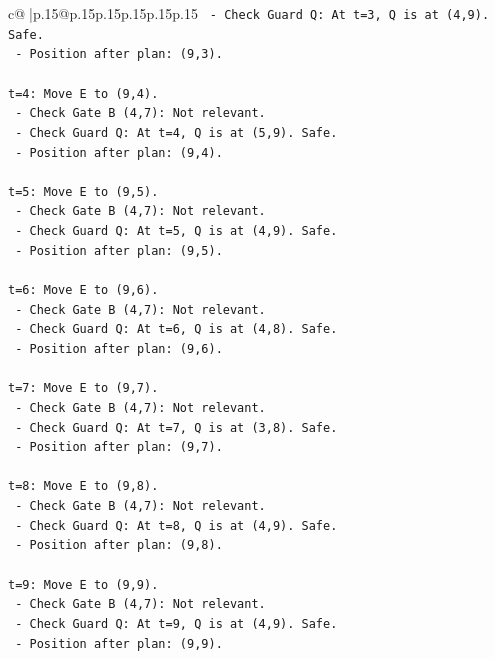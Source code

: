 \documentclass{article}
\begin{document}
{\begin{supertabular}{c@{$\;$}|p{.15\linewidth}@{}p{.15\linewidth}p{.15\linewidth}p{.15\linewidth}p{.15\linewidth}p{.15\linewidth}}
{{{\texttt{   {-} Check Guard Q: At t=3, Q is at (4,9). Safe.} \\
\texttt{   {-} Position after plan: (9,3).} \\
\\ 
\texttt{t=4: Move E to (9,4).} \\
\texttt{   {-} Check Gate B (4,7): Not relevant.} \\
\texttt{   {-} Check Guard Q: At t=4, Q is at (5,9). Safe.} \\
\texttt{   {-} Position after plan: (9,4).} \\
\\ 
\texttt{t=5: Move E to (9,5).} \\
\texttt{   {-} Check Gate B (4,7): Not relevant.} \\
\texttt{   {-} Check Guard Q: At t=5, Q is at (4,9). Safe.} \\
\texttt{   {-} Position after plan: (9,5).} \\
\\ 
\texttt{t=6: Move E to (9,6).} \\
\texttt{   {-} Check Gate B (4,7): Not relevant.} \\
\texttt{   {-} Check Guard Q: At t=6, Q is at (4,8). Safe.} \\
\texttt{   {-} Position after plan: (9,6).} \\
\\ 
\texttt{t=7: Move E to (9,7).} \\
\texttt{   {-} Check Gate B (4,7): Not relevant.} \\
\texttt{   {-} Check Guard Q: At t=7, Q is at (3,8). Safe.} \\
\texttt{   {-} Position after plan: (9,7).} \\
\\ 
\texttt{t=8: Move E to (9,8).} \\
\texttt{   {-} Check Gate B (4,7): Not relevant.} \\
\texttt{   {-} Check Guard Q: At t=8, Q is at (4,9). Safe.} \\
\texttt{   {-} Position after plan: (9,8).} \\
\\ 
\texttt{t=9: Move E to (9,9).} \\
\texttt{   {-} Check Gate B (4,7): Not relevant.} \\
\texttt{   {-} Check Guard Q: At t=9, Q is at (4,9). Safe.} \\
\texttt{   {-} Position after plan: (9,9).} \\
\\ 
}}}
\end{supertabular}}
\end{document}
